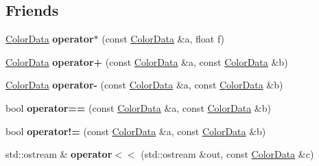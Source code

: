 \subsection*{Friends}
\begin{DoxyCompactItemize}
\item 
\hyperlink{classimage__tools_1_1ColorData}{Color\+Data} {\bfseries operator$\ast$} (const \hyperlink{classimage__tools_1_1ColorData}{Color\+Data} \&a, float f)\hypertarget{classimage__tools_1_1ColorData_adf9a770243996e50282d248a4327f351}{}\label{classimage__tools_1_1ColorData_adf9a770243996e50282d248a4327f351}

\item 
\hyperlink{classimage__tools_1_1ColorData}{Color\+Data} {\bfseries operator+} (const \hyperlink{classimage__tools_1_1ColorData}{Color\+Data} \&a, const \hyperlink{classimage__tools_1_1ColorData}{Color\+Data} \&b)\hypertarget{classimage__tools_1_1ColorData_afee00faf26189979b72f3854a17200ae}{}\label{classimage__tools_1_1ColorData_afee00faf26189979b72f3854a17200ae}

\item 
\hyperlink{classimage__tools_1_1ColorData}{Color\+Data} {\bfseries operator-\/} (const \hyperlink{classimage__tools_1_1ColorData}{Color\+Data} \&a, const \hyperlink{classimage__tools_1_1ColorData}{Color\+Data} \&b)\hypertarget{classimage__tools_1_1ColorData_a799bd54f65a61569b5b968062ac0d37e}{}\label{classimage__tools_1_1ColorData_a799bd54f65a61569b5b968062ac0d37e}

\item 
bool {\bfseries operator==} (const \hyperlink{classimage__tools_1_1ColorData}{Color\+Data} \&a, const \hyperlink{classimage__tools_1_1ColorData}{Color\+Data} \&b)\hypertarget{classimage__tools_1_1ColorData_a9dae9e77610393d100312c9d248f09cc}{}\label{classimage__tools_1_1ColorData_a9dae9e77610393d100312c9d248f09cc}

\item 
bool {\bfseries operator!=} (const \hyperlink{classimage__tools_1_1ColorData}{Color\+Data} \&a, const \hyperlink{classimage__tools_1_1ColorData}{Color\+Data} \&b)\hypertarget{classimage__tools_1_1ColorData_a698ac263a286afe37e3b9ed0c5882c8c}{}\label{classimage__tools_1_1ColorData_a698ac263a286afe37e3b9ed0c5882c8c}

\item 
std\+::ostream \& {\bfseries operator$<$$<$} (std\+::ostream \&out, const \hyperlink{classimage__tools_1_1ColorData}{Color\+Data} \&c)\hypertarget{classimage__tools_1_1ColorData_aa45bd00a1836c5a180481dad96fd7ea3}{}\label{classimage__tools_1_1ColorData_aa45bd00a1836c5a180481dad96fd7ea3}

\end{DoxyCompactItemize}


